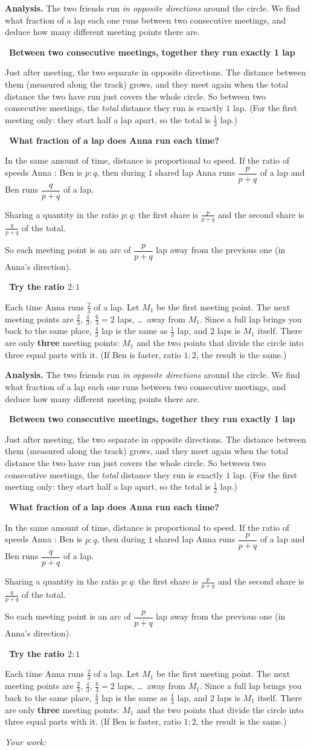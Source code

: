 \documentclass[11pt]{article}
\newif\ifsol \soltrue
\newcommand{\StuProb}[2]{\begin{probboxS}{#1}{#2}\StuProbBody\end{probboxS}}
\newcommand{\probsol}[1]{%
  \begin{lrbox}{\solmeasure}\begin{minipage}{\dimexpr\linewidth-24pt\relax}#1\end{minipage}\end{lrbox}%
  \ifsol
    \begin{solbox}#1\end{solbox}%
  \else
    \setlength{\solht}{\dimexpr\ht\solmeasure+\dp\solmeasure+0.85cm\relax}%
    \ifdim\solht<1.35cm\setlength{\solht}{1.35cm}\fi
    \ifdim\solht>\StudentMaxWork\setlength{\solht}{\StudentMaxWork}\fi
    \par\noindent\begin{minipage}{\linewidth}%
    \expandafter\StuProb\StuProbArgs
    \begin{tcolorbox}[colback=white,colframe=Line,boxrule=0.8pt,arc=5pt,
      left=8pt,right=8pt,top=4pt,bottom=4pt,height=\solht]{\footnotesize\color{Slate}\itshape\WorkWord}\end{tcolorbox}%
    \end{minipage}\par\medskip
  \fi}
\newlength{\StudentMaxWork}\setlength{\StudentMaxWork}{4.5cm}
\newcommand{\step}[2]{\par\smallskip\noindent{\bfseries\color{tmBlue!85!black}\StepWord~#1.}\ {\bfseries #2}\par\nopagebreak}
\def\WorkWord{Your work:}
\def\StepWord{Step}
\begin{document}
\probsol{
\textbf{Analysis.} The two friends run \emph{in opposite directions} around the circle. We find what fraction of a lap each one runs between two consecutive meetings, and deduce how many different meeting points there are.

\step{1}{Between two consecutive meetings, together they run exactly 1 lap}
\begin{proofbox}Just after meeting, the two separate in opposite directions. The distance between them (measured along the track) grows, and they meet again when the total distance the two have run just covers the whole circle. So between two consecutive meetings, the \emph{total} distance they run is exactly $1$ lap. (For the first meeting only: they start half a lap apart, so the total is $\frac12$ lap.)\end{proofbox}

\step{2}{What fraction of a lap does Anna run each time?}
In the same amount of time, distance is proportional to speed. If the ratio of speeds Anna : Ben is $p:q$, then during $1$ shared lap Anna runs $\dfrac{p}{p+q}$ of a lap and Ben runs $\dfrac{q}{p+q}$ of a lap.
\begin{recallbox}Sharing a quantity in the ratio $p:q$: the first share is $\frac{p}{p+q}$ and the second share is $\frac{q}{p+q}$ of the total.\end{recallbox}
So each meeting point is an arc of $\dfrac{p}{p+q}$ lap away from the previous one (in Anna's direction).

\step{3}{Try the ratio $2:1$}
Each time Anna runs $\frac{2}{3}$ of a lap. Let $M_1$ be the first meeting point. The next meeting points are $\frac23$, $\frac43$, $\frac63=2$ laps, \dots\ away from $M_1$. Since a full lap brings you back to the same place, $\frac43$ lap is the same as $\frac13$ lap, and $2$ laps is $M_1$ itself. There are only \textbf{three} meeting points: $M_1$ and the two points that divide the circle into three equal parts with it. (If Ben is faster, ratio $1:2$, the result is the same.)

}
\end{document}
